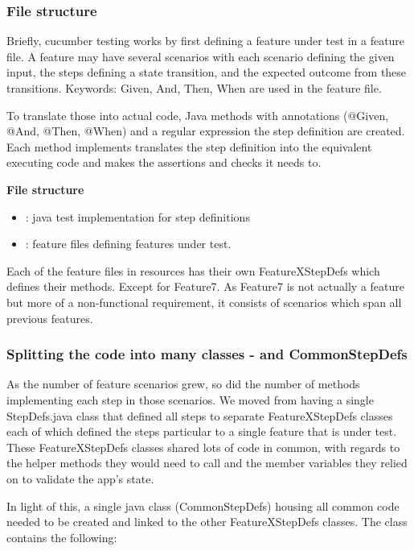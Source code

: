 \subsubsection{File structure}

Briefly, cucumber testing works by first defining a feature under test in a feature file. A feature may have several scenarios with each scenario defining the given input, the steps defining a state transition, and the expected outcome from these transitions. Keywords: Given, And, Then, When are used in the feature file. 
\par
To translate those into actual code, Java methods with annotations (@Given, @And, @Then, @When) and a regular expression the step definition are created. Each method implements translates the step definition into the equivalent executing code and makes the assertions and checks it needs to. 
\par
\textbf{File structure}
\begin{itemize}
    \item {}: java test implementation for step definitions 
    \item {}: feature files defining features under test. 
\end{itemize}

Each of the feature files in resources has their own FeatureXStepDefs which defines their methods. Except for Feature7. As Feature7 is not actually a feature but more of a non-functional requirement, it consists of scenarios which span all previous features. 

\subsubsection{Splitting the code into many classes - and CommonStepDefs}
As the number of feature scenarios grew, so did the number of methods implementing each step in those scenarios. 
We moved from having a single StepDefs.java class that defined all steps to separate FeatureXStepDefs classes each of which defined the steps particular to a single feature that is under test.
These FeatureXStepDefs classes shared lots of code in common, with regards to the helper methods they would need to call and the member variables they relied on to validate the app's state. 
\par
In light of this, a single java class (CommonStepDefs) housing all common code needed to be created and linked to the other FeatureXStepDefs classes. The class contains the following: 

